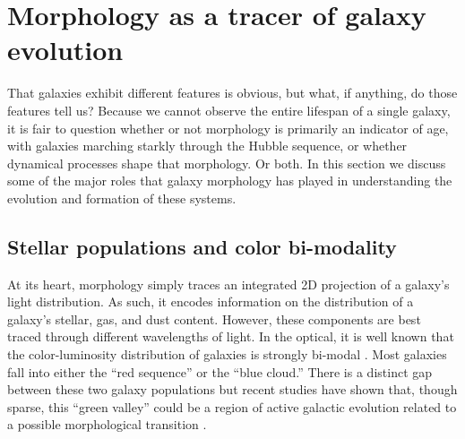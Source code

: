 \section{Morphology as a tracer of galaxy evolution}
\label{chap1: morph gal evolution}

That galaxies exhibit different features is obvious, but what, if anything, do those features tell us? Because we cannot observe the entire lifespan of a single galaxy, it is fair to question whether or not morphology is primarily an indicator of age, with galaxies marching starkly through the Hubble sequence, or whether dynamical processes shape that morphology. Or both. In this section we discuss some of the major roles that galaxy morphology has played in understanding the evolution and formation of these systems. 



\subsection{Stellar populations and color bi-modality}
\label{chap1: stellar populations}

At its heart, morphology simply traces an integrated 2D projection of a galaxy's light distribution. As such, it encodes information on the distribution of a galaxy's stellar, gas, and dust content. However, these components are best traced through different wavelengths of light. In the optical, it is well known that the color-luminosity distribution of galaxies is strongly bi-modal \citep{Baldry2004b}. Most galaxies fall into either the ``red sequence'' or the ``blue cloud.'' There is a distinct gap between these two galaxy populations but recent studies have shown that, though sparse, this ``green valley'' could be a region of active galactic evolution related to a possible morphological transition \citep{Schawinski2007}.

